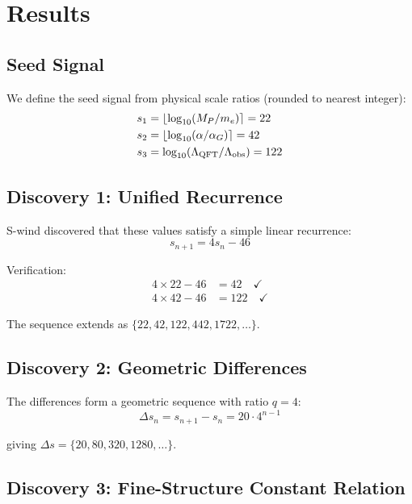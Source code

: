 \documentclass[twocolumn,prl,aps,superscriptaddress]{revtex4-2}
\begin{document}
\section{Results}

\subsection{Seed Signal}

We define the seed signal from physical scale ratios (rounded to nearest integer):
\begin{align}
s_1 &= \lfloor \log_{10}(M_P/m_e) \rceil = 22 \\
s_2 &= \lfloor \log_{10}(\alpha/\alpha_G) \rceil = 42 \\
s_3 &= \log_{10}(\Lambda_{\rm QFT}/\Lambda_{\rm obs}) = 122
\end{align}

\subsection{Discovery 1: Unified Recurrence}

S-wind discovered that these values satisfy a simple linear recurrence:
\begin{equation}
\boxed{s_{n+1} = 4s_n - 46}
\end{equation}

Verification:
\begin{align}
4 \times 22 - 46 &= 42 \quad \checkmark \\
4 \times 42 - 46 &= 122 \quad \checkmark
\end{align}

The sequence extends as $\{22, 42, 122, 442, 1722, \ldots\}$.

\subsection{Discovery 2: Geometric Differences}

The differences form a geometric sequence with ratio $q=4$:
\begin{equation}
\Delta s_n = s_{n+1} - s_n = 20 \cdot 4^{n-1}
\end{equation}

giving $\Delta s = \{20, 80, 320, 1280, \ldots\}$.

\subsection{Discovery 3: Fine-Structure Constant Relation}
\end{document}
